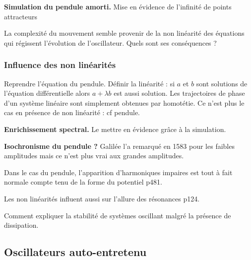 \begin{experience}
\textbf{Simulation du pendule amorti.}
Mise en évidence de l'infinité de points attracteurs
\end{experience}

\begin{transition}
La complexité du mouvement semble provenir de la non linéarité des équations qui régissent l'évolution de l'oscillateur.
Quels sont ses conséquences ?
\end{transition}

\subsubsection{Influence des non linéarités}

Reprendre l'équation du pendule.
Définir la linéarité : si $a$ et $b$ sont solutions de l'équation différentielle alors $a+\lambda b$ est aussi solution.
Les trajectoires de phase d'un système linéaire sont simplement obtenues par homotétie.
Ce n'est plus le cas en présence de non linéarité : cf pendule.

\begin{experience}
\textbf{Enrichissement spectral.}
Le mettre en évidence grâce à la simulation.
\end{experience}

\begin{experience}
\textbf{Isochronisme du pendule ?}
Galilée l'a remarqué en 1583 pour les faibles amplitudes mais ce n'est plus vrai aux grandes amplitudes.
\end{experience}

\begin{remarque}
Dans le cas du pendule, l'apparition d'harmoniques impaires est tout à fait normale compte tenu de la forme du potentiel \cite{Fruchart2016} p481.

\noindent
Les non linéarités influent aussi sur l'allure des résonances \cite{Landau1969} p124.
\end{remarque}

\begin{transition}
Comment expliquer la stabilité de systèmes oscillant malgré la présence de dissipation.
\end{transition}

\subsection{Oscillateurs auto-entretenu}

